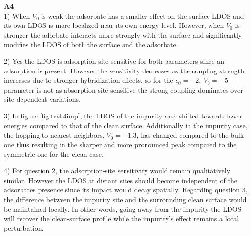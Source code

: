 \textbf{A4}
\\
1) When $V_0$ is weak the adsorbate has a smaller effect on the surface LDOS and its own LDOS is more localized near its own energy level. However, when $V_0$ is stronger the adorbate interacts more strongly with the surface and significantly modifies the LDOS of both the surface and the adsorbate.  

2) Yes the LDOS is adsorption-site sensitive for both parameters since an adsorption is present. However the sensitivity decreases as the coupling strength increases due to stronger hybridization effects, so for the $\epsilon_0=-2,\:V_0=-5$ parameter is not as absorption-site sensitive the strong coupling dominates over site-dependent variations.

3) In figure \ref{fig:task4imp}, the LDOS of the impurity case shifted towards lower energies compared to that of the clean surface. Additionally in the impurity case, the hopping to nearest neighbors, $V_0=-1.3$, has changed compared to the bulk one thus resulting in the sharper and more pronounced peak compared to the symmetric one for the clean case.

4) For question 2, the adsorption-site sensitivity would remain qualitatively similar. However the LDOS at distant sites should become independent of the adsorbates presence since its impact would decay spatially. Regarding question 3, the difference between the impurity site and the surrounding clean surface would be maintained locally. In other words, going away from the impurity the LDOS will recover the clean-surface profile while the impurity’s effect remains a local perturbation.